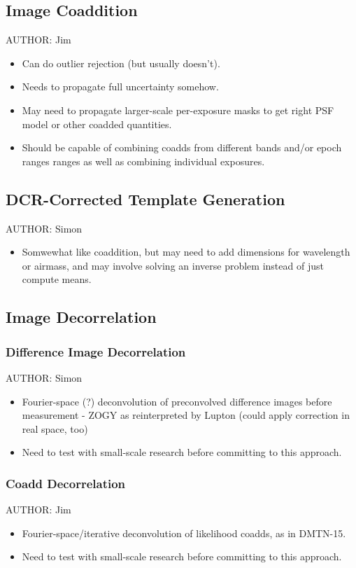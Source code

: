 \subsection{Image Coaddition}
AUTHOR: Jim
\begin{itemize}
\item Can do outlier rejection (but usually doesn't).
\item Needs to propagate full uncertainty somehow.
\item May need to propagate larger-scale per-exposure masks to get right PSF model or other coadded quantities.
\item Should be capable of combining coadds from different bands and/or epoch ranges ranges as well as combining individual exposures.
\end{itemize}

\subsection{DCR-Corrected Template Generation}
AUTHOR: Simon
\begin{itemize}
\item Somwewhat like coaddition, but may need to add dimensions for wavelength or airmass, and may involve solving an inverse problem instead of just compute means.
\end{itemize}

\subsection{Image Decorrelation}
\subsubsection{Difference Image Decorrelation}
AUTHOR: Simon
\begin{itemize}
\item Fourier-space (?) deconvolution of preconvolved difference images before measurement - ZOGY as reinterpreted by Lupton (could apply correction in real space, too)
\item Need to test with small-scale research before committing to this approach.
\end{itemize}

\subsubsection{Coadd Decorrelation}
AUTHOR: Jim
\begin{itemize}
\item Fourier-space/iterative deconvolution of likelihood coadds, as in DMTN-15.
\item Need to test with small-scale research before committing to this approach.
\end{itemize}

